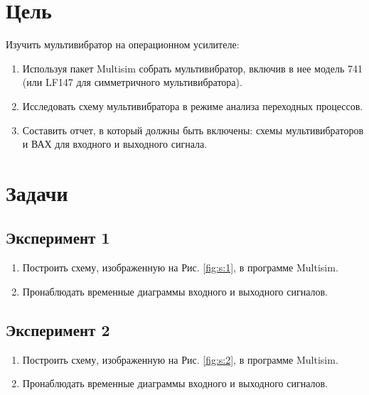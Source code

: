 \documentclass[12pt]{article}
\begin{document}
    \newpage

    \pagestyle{plain}
    \setcounter{page}{1}

    \section*{Цель}

    Изучить мультивибратор на операционном усилителе:

    \begin{enumerate}
        \item Используя пакет Multisim собрать мультивибратор, включив в нее модель 741 (или LF147 для симметричного мультивибратора).

        \item Исследовать схему мультивибратора в режиме анализа переходных процессов.

        \item Составить отчет, в который должны быть включены: схемы мультивибраторов и ВАХ для входного и выходного сигнала.
    \end{enumerate}

    \section*{Задачи}

    \subsection*{Эксперимент 1}

    \begin{enumerate}
        \item Построить схему, изображенную на Рис. \ref{fig:s:1}, в программе Multisim.
        \item Пронаблюдать временные диаграммы входного и выходного сигналов.
    \end{enumerate}

    \subsection*{Эксперимент 2}

    \begin{enumerate}
        \item Построить схему, изображенную на Рис. \ref{fig:s:2}, в программе Multisim.
        \item Пронаблюдать временные диаграммы входного и выходного сигналов.
    \end{enumerate}
\end{document}
